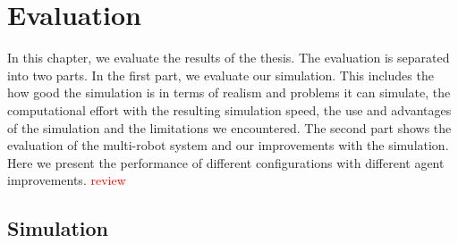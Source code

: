 \chapter{Evaluation}
\label{cha:evaluation}
In this chapter, we evaluate the results of the thesis. The evaluation is separated into two parts. In the first part, we evaluate our simulation. This includes the how good the simulation is in terms of realism and problems it can simulate, the computational effort with the resulting simulation speed, the use and advantages of the simulation and the limitations we encountered. The second part shows the evaluation of the multi-robot system and our improvements with the simulation. Here we present the performance of different configurations with different agent improvements.
\textcolor{red}{review}

\section{Simulation}
\label{sec:simulation}
